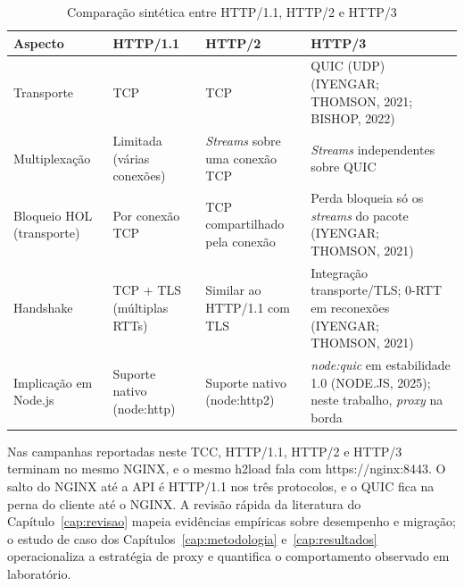 \begin{table}[htbp]
\centering
\caption{Comparação sintética entre HTTP/1.1, HTTP/2 e HTTP/3}\label{tab:comparacao-protocolos}
\small
\setlength{\tabcolsep}{3pt}
\begin{tabular}{@{}>{\raggedright\arraybackslash}p{28mm}>{\raggedright\arraybackslash}p{32mm}>{\raggedright\arraybackslash}p{36mm}>{\raggedright\arraybackslash}p{46mm}@{}}
\hline
\textbf{Aspecto} & \textbf{HTTP/1.1} & \textbf{HTTP/2} & \textbf{HTTP/3} \\
\hline
Transporte & TCP & TCP & QUIC (UDP) (IYENGAR; THOMSON, 2021; BISHOP, 2022) \\
Multiplexação & Limitada (várias conexões) & \textit{Streams} sobre uma conexão TCP & \textit{Streams} independentes sobre QUIC \\
Bloqueio HOL (transporte) & Por conexão TCP & TCP compartilhado pela conexão & Perda bloqueia só os \textit{streams} do pacote (IYENGAR; THOMSON, 2021) \\
Handshake & TCP + TLS (múltiplas RTTs) & Similar ao HTTP/1.1 com TLS & Integração transporte/TLS; 0-RTT em reconexões (IYENGAR; THOMSON, 2021) \\
Implicação em Node.js & Suporte nativo (node:http) & Suporte nativo (node:http2) & \textit{node:quic} em estabilidade 1.0 (NODE.JS, 2025); neste trabalho, \textit{proxy} na borda \\
\hline
\end{tabular}
\end{table}

Nas campanhas reportadas neste TCC, HTTP/1.1, HTTP/2 e HTTP/3 terminam no mesmo NGINX, e o mesmo h2load fala com https://nginx:8443. O salto do NGINX até a API é HTTP/1.1 nos três protocolos, e o QUIC fica na perna do cliente até o NGINX. A revisão rápida da literatura do Capítulo~\ref{cap:revisao} mapeia evidências empíricas sobre desempenho e migração; o estudo de caso dos Capítulos~\ref{cap:metodologia} e~\ref{cap:resultados} operacionaliza a estratégia de proxy e quantifica o comportamento observado em laboratório.

